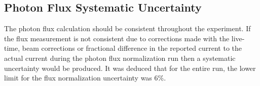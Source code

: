 \subsection{Photon Flux Systematic Uncertainty}
 		The photon flux calculation should be consistent throughout the experiment. If the flux measurement is not consistent due to corrections made with the live-time, beam corrections or fractional difference in the reported current to the actual current during the photon flux normalization run then a systematic uncertainty would be produced. It was deduced that for the entire  run, the lower limit for the flux normalization uncertainty was 6\%. 
% 		
 		
